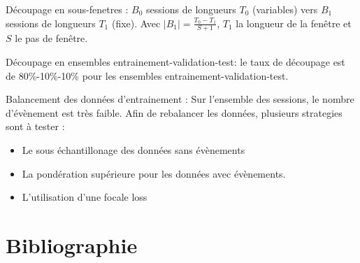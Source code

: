 \documentclass{article}
\begin{document}
    Découpage en sous-fenetres : $B_0$ sessions de longueurs $T_0$ (variables) vers $B_1$ sessions de longueurs $T_1$ (fixe). Avec $|B_1| = \frac{T_0-T_1}{S+1}$, $T_1$ la longueur de la fenêtre et $S$ le pas de fenêtre.

    Découpage en ensembles entrainement-validation-test: le taux de découpage est de 80\%-10\%-10\% pour les ensembles entrainement-validation-test.

    Balancement des données d'entrainement : Sur l'ensemble des sessions, le nombre d'évènement est très faible. Afin de rebalancer les données, plusieurs strategies sont à tester :
    \begin{itemize}
        \item Le sous échantillonage des données sans évènements
        \item La pondération supérieure pour les données avec évènements.
        \item L'utilisation d'une focale loss
    \end{itemize}
    \section{Bibliographie}
\end{document}
